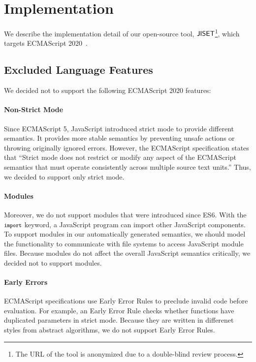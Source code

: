 \section{Implementation}\label{sec:impl}
We describe the implementation detail of our open-source
tool, \( \text{\sf JISET} \)\footnote{The URL of the tool is anonymized due to a
double-blind review process.}, which targets
ECMAScript 2020~\cite{es2020}.


\subsection{Excluded Language Features}\label{sec:exclusion}
We decided not to support the following ECMAScript 2020 features:

\vspace*{-.5em}
\paragraph{Non-Strict Mode}
Since ECMAScript 5, JavaScript introduced strict mode to
provide different semantics.  It
provides more stable semantics by preventing unsafe actions or
throwing originally ignored errors.  However, the ECMAScript
specification states that ``Strict mode does not restrict or modify
any aspect of the ECMAScript semantics that must operate consistently
across multiple source text units.''  Thus, we decided to support only
strict mode.

\vspace*{-.5em}
\paragraph{Modules}
Moreover, we do not support modules that were introduced since ES6.
With the \( \texttt{\footnotesize import} \) keyword, a JavaScript
program can import other JavaScript components.  To support
modules in our automatically generated semantics, we should model the
functionality to communicate with file systems to access JavaScript
module files.  Because modules do not affect the overall JavaScript
semantics critically, we decided not to support modules.

\vspace*{-.5em}
\paragraph{Early Errors}
ECMAScript specifications use Early Error Rules to preclude invalid code
before evaluation. For example, an Early Error Rule checks whether
functions have duplicated parameters in strict mode.
Because they are written in differenet styles from abstract algorithms,
we do not support Early Error Rules.

